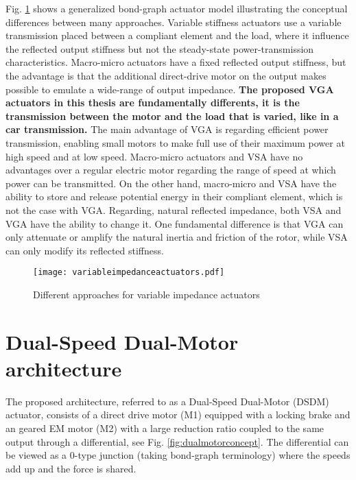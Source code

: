 Fig. \ref{fig:variableimpedanceactuators} shows a generalized bond-graph actuator model illustrating the conceptual differences between many approaches. Variable stiffness actuators use a variable transmission placed between a compliant element and the load, where it influence the reflected output stiffness but not the steady-state power-transmission characteristics. Macro-micro actuators have a fixed reflected output stiffness, but the advantage is that the additional direct-drive motor on the output makes possible to emulate a wide-range of output impedance. \textbf{The proposed VGA actuators in this thesis are fundamentally differents, it is the transmission between the motor and the load that is varied, like in a car transmission.} The main advantage of VGA is regarding efficient power transmission, enabling small motors to make full use of their maximum power at high speed and at low speed. Macro-micro actuators and VSA have no advantages over a regular electric motor regarding the range of speed at which power can be transmitted. On the other hand, macro-micro and VSA have the ability to store and release potential energy in their compliant element, which is not the case with VGA. Regarding, natural reflected impedance, both VSA and VGA have the ability to change it. One fundamental difference is that VGA can only attenuate or amplify the natural inertia and friction of the rotor, while VSA can only modify its reflected stiffness. 

\begin{figure}[htp]
	\centering
		\texttt{[image: variableimpedanceactuators.pdf]}
	\caption{Different approaches for variable impedance actuators}
	\label{fig:variableimpedanceactuators}
\end{figure}





\newpage

\section{Dual-Speed Dual-Motor architecture}
\label{sec:DSDM}

The proposed architecture, referred to as a Dual-Speed Dual-Motor (DSDM) actuator, consists of a direct drive motor (M1) equipped with a locking brake and an geared EM motor (M2) with a large reduction ratio coupled to the same output through a differential, see Fig. \ref{fig:dualmotorconcept}. The differential can be viewed as a 0-type junction (taking bond-graph terminology) where the speeds add up and the force is shared. 


